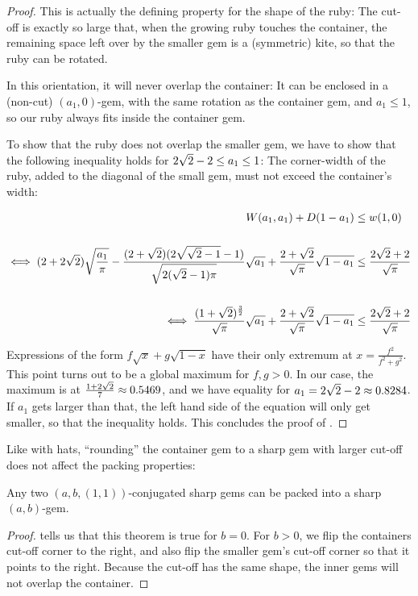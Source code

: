 \documentclass[a4paper,style=print,bibliography=totoc,nexus,lnum,extramargin]{tubsbook}
\begin{document}
\begin{proof}
    This is actually the defining property for the shape of the ruby: The cut-off is exactly so large that, when the growing ruby touches the container, the remaining space left over by the smaller gem is a (symmetric) kite, so that the ruby can be rotated.

    In this orientation, it will never overlap the container: It can be enclosed in a (non-cut) $(a_1, 0)$-gem, with the same rotation as the container gem, and $a_1 \le 1$, so our ruby always fits inside the container gem.

    To show that the ruby does not overlap the smaller gem, we have to show that the following inequality holds for $2\sqrt{2}-2 \le a_1 \le 1$: The corner-width of the ruby, added to the diagonal of the small gem, must not exceed the container's width:

    \begin{align*}
        W(a_1,a_1) + D(1-a_1) &\le w(1,0)\\
        \\
        \iff (2+2\sqrt{2})\sqrt{\frac{a_1}{\pi}} - \frac{(2+\sqrt{2})(2\sqrt{\sqrt{2}-1}-1)}{\sqrt{2(\sqrt{2}-1)\pi}}\sqrt{a_1} + \frac{2+\sqrt{2}}{\sqrt{\pi}}\sqrt{1-a_1} &\le \frac{2\sqrt{2} + 2}{\sqrt{\pi}}\\
        \\
        \iff \frac{(1+\sqrt{2})^{\frac{3}{2}}}{\sqrt{\pi}}\sqrt{a_1} + \frac{2+\sqrt{2}}{\sqrt{\pi}}\sqrt{1-a_1} &\le \frac{2\sqrt{2} + 2}{\sqrt{\pi}}
    \end{align*}

    Expressions of the form $f\sqrt{x} + g\sqrt{1-x}$ have their only extremum at $x = \frac{f^2}{f^2+g^2}$. This point turns out to be a global maximum for $f,g > 0$. In our case, the maximum is at $\frac{1+2\sqrt{2}}{7} \approx 0.5469$, and we have equality for $a_1 = 2\sqrt{2}-2 \approx 0.8284$. If $a_1$ gets larger than that, the left hand side of the equation will only get smaller, so that the inequality holds. This concludes the proof of .
\end{proof}

Like with hats, “rounding” the container gem to a sharp gem with larger cut-off does not affect the packing properties:

\begin{lemma}\label{th:rounded-gems-in-gem}
    Any two $(a, b, (1,1))$-conjugated sharp gems can be packed into a sharp $(a,b)$-gem.
\end{lemma}

\begin{proof}
     tells us that this theorem is true for $b = 0$. 
    For $b > 0$, we flip the containers cut-off corner to the right, and also flip the smaller gem's cut-off corner so that it points to the right. Because the cut-off has the same shape, the inner gems will not overlap the container.
\end{proof}
\end{document}
